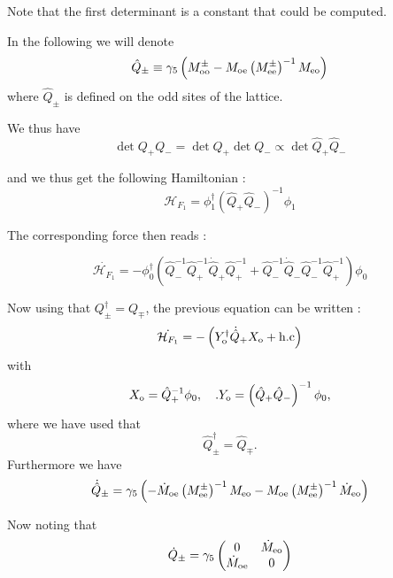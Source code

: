 \documentclass{article}[12pt]
\begin{document}
Note that the first determinant is a constant that could be computed.

In the following we will denote 
\begin{equation}
\hat{Q}_{\pm} \equiv \gamma_5
  \left(M^{\pm}_{\rm{oo}} - M_{\rm{oe}}
    \left(M^{\pm}_{\rm{ee}}\right)^{-1} M_{\rm{eo}} \right)
\end{equation}
where $\hat{Q}_{\pm}$ is defined on the odd sites of the lattice. 


We thus have 
\begin{equation}
\det{Q_+ Q_-} = \det{Q_+}\det{Q_{-}}\propto\det{\hat{Q}_+ \hat{Q}_-} 
\end{equation}

and we thus get the following Hamiltonian :
\begin{equation}
\mathcal{H}_{F_1} = \phi_1^{\dagger} \left(\hat{Q}_+
    \hat{Q}_-\right)^{-1} \phi_1
\end{equation} 

The corresponding force then reads :

\begin{equation}
\dot{\mathcal{H}_{F_1}} = - \phi_{0}^\dagger\left(    \hat{Q}_-^{-1}
  \hat{Q}_+^{-1}  \dot{\hat{Q}}_+  \hat{Q}_+^{-1}  + \hat{Q}_{-}^{-1}
  \dot{\hat{Q}}_{-}  \hat{Q}_-^{-1}   \hat{Q}_+^{-1}    \right)    \phi_0
\end{equation}

Now using that   $Q_{\pm} ^{\dagger} = Q_{\mp}$, the previous equation
can be written :
\begin{equation}
\dot{\mathcal{H}_{F_1}} = - \left(Y_{\rm{o}}^{\dagger} \dot{\hat{Q}}_{+} X_{\rm{o}}  + \rm{h.c}\right)
\end{equation}
with 
\begin{equation}
  X_{\rm{o}}=\hat{Q}_+^{-1}\phi_0,\quad. Y_{\rm{o}}= \left(\hat{Q}_+
    \hat{Q}_-\right)^{-1} \phi_0,
\end{equation}
where we have used that 
\begin{equation}
  \hat{Q}_\pm^{\dagger} = \hat{Q}_\mp.
\end{equation}
Furthermore we have 
\begin{equation}
\dot{\hat{Q}}_{\pm} =  \gamma_5 \left( -  \dot{M}_{\rm{oe}}
  \left(M^{\pm}_{\rm{ee}}\right)^{-1} M_{\rm{eo}} -  M_{\rm{oe}}
    \left(M^{\pm}_{\rm{ee}}\right)^{-1} \dot{M}_{\rm{eo}}\right)
\end{equation}

Now noting that  
\begin{equation}
  \dot{Q}_{\pm} =  \gamma_5 \begin{pmatrix} 
 0  & \dot{M}_{\rm{eo}} \\
\dot{M}_{\rm{oe}} & 0\\
\end{pmatrix}
\end{equation}
\end{document}
